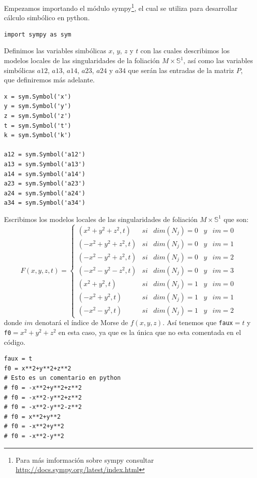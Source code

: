 \documentclass[a4paper,10pt]{book}
\begin{document}
\vspace{5mm}

Empezamos importando el m\'odulo sympy\footnote{Para m\'as imformaci\'on sobre sympy consultar \url{http://docs.sympy.org/latest/index.html}}, el cual se utiliza para desarrollar c\'alculo simb\'olico en python.   

\begin{lstlisting}[frame=single]
import sympy as sym
\end{lstlisting}
Definimos las variables simb\'olicas $x$, $y$, $z$ y $t$ con las cuales describimos los modelos locales de las singularidades de la foliaci\'on $M\times \mathbb{S}^{1}$, as\'i como las variables simb\'olicas $a12$, $a13$, $a14$, $a23$, $a24$ y $a34$ que ser\'an las entradas de la matriz $P$, que definiremos m\'as adelante.     
\begin{lstlisting}[frame=single]
x = sym.Symbol('x')
y = sym.Symbol('y')
z = sym.Symbol('z')
t = sym.Symbol('t')
k = sym.Symbol('k')

a12 = sym.Symbol('a12')
a13 = sym.Symbol('a13')
a14 = sym.Symbol('a14')
a23 = sym.Symbol('a23')
a24 = sym.Symbol('a24')
a34 = sym.Symbol('a34')
\end{lstlisting}
Escribimos los modelos locales de las singularidades de foliaci\'on $M\times\mathbb{S}^1$ que son:
\[ F(x,y,z,t) = \left\{ \begin{array}{lcccc}
             ( x^2+y^2+z^2,t) & si & dim(N_{j})=0 & y & im=0 \\
             (-x^2+y^2+z^2,t) & si & dim(N_{j})=0 & y & im=1 \\
             (-x^2-y^2+z^2,t) & si & dim(N_{j})=0 & y & im=2 \\
             (-x^2-y^2-z^2,t) & si & dim(N_{j})=0 & y & im=3 \\
             ( x^2+y^2,t) & si & dim(N_{j})=1 & y & im=0 \\
             (-x^2+y^2,t) & si & dim(N_{j})=1 & y & im=1 \\
             (-x^2-y^2,t) & si & dim(N_{j})=1 & y & im=2 
             \end{array}
   \right. \]
donde $im$ denotar\'a el \'indice de Morse de $f(x,y,z)$. As\'i tenemos que \texttt{faux}$=t$ y \texttt{f0}$=x^2+y^2+z^2$ en esta caso, ya que es la \'unica que no esta comentada en el c\'odigo.
\begin{lstlisting}
faux = t
f0 = x**2+y**2+z**2
# Esto es un comentario en python
# f0 = -x**2+y**2+z**2 
# f0 = -x**2-y**2+z**2
# f0 = -x**2-y**2-z**2
# f0 = x**2+y**2
# f0 = -x**2+y**2
# f0 = -x**2-y**2
\end{lstlisting}
\end{document}
